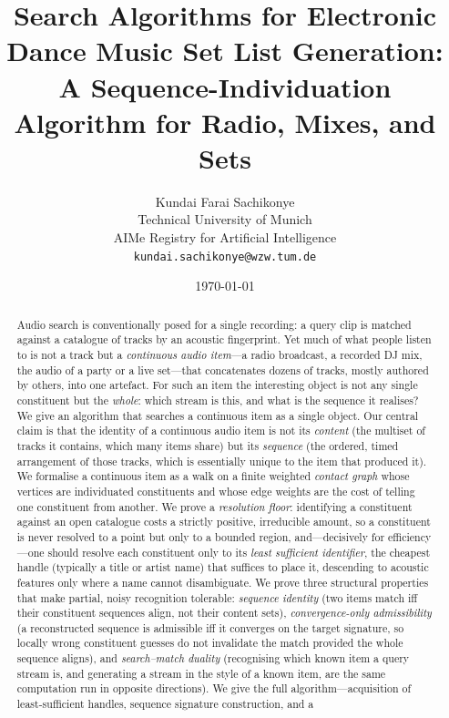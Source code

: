 \documentclass[11pt,twocolumn,a4paper]{article}
\title{\textbf{Search Algorithms for Electronic Dance Music Set List Generation: \\[3pt]
A Sequence-Individuation Algorithm for Radio, Mixes, and Sets}}
\author{%
Kundai Farai Sachikonye\\
\small Technical University of Munich\\
\small AIMe Registry for Artificial Intelligence\\
\small \texttt{kundai.sachikonye@wzw.tum.de}}
\date{\today}
\theoremstyle{thmstyle}
\theoremstyle{definition}
\theoremstyle{remark}
\begin{document}
\maketitle

\begin{abstract}
\noindent
Audio search is conventionally posed for a single recording: a query clip is
matched against a catalogue of tracks by an acoustic fingerprint. Yet much of
what people listen to is not a track but a \emph{continuous audio item}---a
radio broadcast, a recorded DJ mix, the audio of a party or a live set---that
concatenates dozens of tracks, mostly authored by others, into one artefact.
For such an item the interesting object is not any single constituent but the
\emph{whole}: which stream is this, and what is the sequence it realises? We
give an algorithm that searches a continuous item as a single object. Our
central claim is that the identity of a continuous audio item is not its
\emph{content} (the multiset of tracks it contains, which many items share) but
its \emph{sequence} (the ordered, timed arrangement of those tracks, which is
essentially unique to the item that produced it). We formalise a continuous
item as a walk on a finite weighted \emph{contact graph} whose vertices are
individuated constituents and whose edge weights are the cost of telling one
constituent from another. We prove a \emph{resolution floor}: identifying a
constituent against an open catalogue costs a strictly positive, irreducible
amount, so a constituent is never resolved to a point but only to a bounded
region, and---decisively for efficiency---one should resolve each constituent
only to its \emph{least sufficient identifier}, the cheapest handle (typically
a title or artist name) that suffices to place it, descending to acoustic
features only where a name cannot disambiguate. We prove three structural
properties that make partial, noisy recognition tolerable: \emph{sequence
identity} (two items match iff their constituent sequences align, not their
content sets), \emph{convergence-only admissibility} (a reconstructed sequence
is admissible iff it converges on the target signature, so locally wrong
constituent guesses do not invalidate the match provided the whole sequence
aligns), and \emph{search--match duality} (recognising which known item a query
stream is, and generating a stream in the style of a known item, are the same
computation run in opposite directions). We give the full algorithm---acquisition
of least-sufficient handles, sequence signature construction, and a

\end{abstract}
\end{document}
